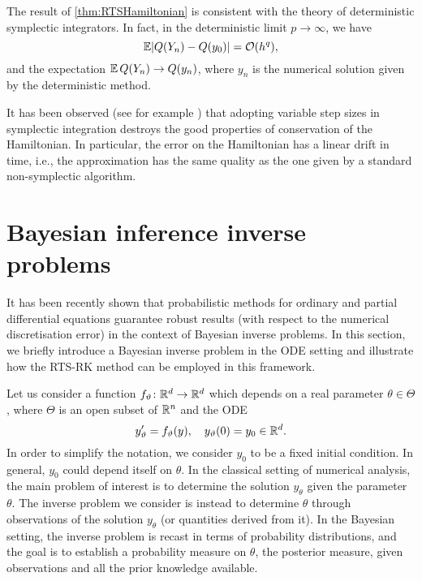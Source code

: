 \documentclass[10pt]{article}
\begin{document}
\begin{remark} The result of \cref{thm:RTSHamiltonian} is consistent with the theory of deterministic symplectic integrators. In fact, in the deterministic limit $p \to \infty$, we have
	\begin{equation}
	\operatorname{\mathbb{E}} \lvert Q(Y_n) - Q(y_0)\rvert = \mathcal{O}(h^q),
	\end{equation}
	and the expectation $\operatorname{\mathbb{E}} Q(Y_n) \to Q(y_n)$, where $y_n$ is the numerical solution given by the deterministic method. 
\end{remark}
\begin{remark} It has been observed (see for example \cite{Hai97, HLW06}) that adopting variable step sizes in symplectic integration destroys the good properties of conservation of the Hamiltonian. In particular, the error on the Hamiltonian has a linear drift in time, i.e., the approximation has the same quality as the one given by a standard non-symplectic algorithm. %
\end{remark}


\section{Bayesian inference inverse problems}\label{sec:BayesianInference} It has been recently shown \cite{CGS16, CCC16} that probabilistic methods for ordinary and partial differential equations guarantee robust results (with respect to the numerical discretisation error) in the context of Bayesian inverse problems. In this section, we briefly introduce a Bayesian inverse problem in the ODE setting and illustrate how the RTS-RK method can be employed in this framework. 

Let us consider a function $f_\vartheta \colon \mathbb{R}^d \to \mathbb{R}^d$ which depends on a real parameter $\theta \in \Theta$, where $\Theta$ is an open subset of $\mathbb{R}^n$ and the ODE
\begin{equation}\label{eq:ODEParam}
	y_\vartheta' = f_\vartheta(y), \quad y_\vartheta(0) = y_0 \in \mathbb{R}^d.
\end{equation}
In order to simplify the notation, we consider $y_0$ to be a fixed initial condition. In general, $y_0$ could depend itself on $\theta$. In the classical setting of numerical analysis, the main problem of interest is to determine the solution $y_\theta$ given the parameter $\theta$. The inverse problem we consider is instead to determine $\theta$ through observations of the solution $y_\theta$ (or quantities derived from it). In the Bayesian setting, the inverse problem is recast in terms of probability distributions, and the goal is to establish a probability measure on $\theta$, the posterior measure, given observations and all the prior knowledge available.
\end{document}
